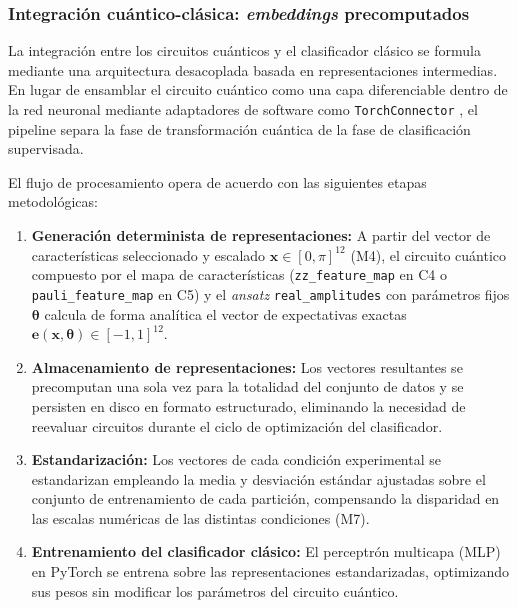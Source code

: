 
\subsubsection{Integración cuántico-clásica: \textit{embeddings} precomputados}

La integración entre los circuitos cuánticos y el clasificador clásico se formula
mediante una arquitectura desacoplada basada en representaciones intermedias.
En lugar de ensamblar el circuito cuántico como una
capa diferenciable dentro de la red neuronal mediante adaptadores de software como
\texttt{TorchConnector} \cite{qiskitml2024}, el pipeline separa la fase
de transformación cuántica de la fase de clasificación supervisada.

El flujo de procesamiento opera de acuerdo con las siguientes etapas metodológicas:
\begin{enumerate}
  \item \textbf{Generación determinista de representaciones:} A partir del vector de
        características seleccionado y escalado $\mathbf{x} \in [0, \pi]^{12}$ (M4),
        el circuito cuántico compuesto por el mapa de características (\texttt{zz\_feature\_map}
        en C4 o \texttt{pauli\_feature\_map} en C5) y el \textit{ansatz} \texttt{real\_amplitudes}
        con parámetros fijos $\boldsymbol{\theta}$ calcula de forma analítica el vector
        de expectativas exactas $\mathbf{e}(\mathbf{x}, \boldsymbol{\theta}) \in [-1, 1]^{12}$.
  \item \textbf{Almacenamiento de representaciones:} Los vectores resultantes se
        precomputan una sola vez para la totalidad del conjunto de datos y se persisten
        en disco en formato estructurado, eliminando la necesidad de reevaluar circuitos
        durante el ciclo de optimización del clasificador.
  \item \textbf{Estandarización:} Los vectores de cada condición experimental
        se estandarizan empleando la media y desviación estándar ajustadas sobre el conjunto de entrenamiento de cada partición, compensando la disparidad
        en las escalas numéricas de las distintas condiciones (M7).
  \item \textbf{Entrenamiento del clasificador clásico:} El perceptrón multicapa (MLP)
        en PyTorch se entrena sobre las representaciones estandarizadas,
        optimizando sus pesos sin modificar los parámetros del circuito cuántico.
\end{enumerate}

